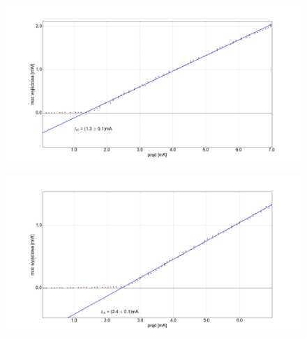 \documentclass[xcolor={dvipsnames,table}]{beamer}
\begin{document}
\begin{frame}
\center
\begin{figure}
   \includegraphics[width=1.10\textwidth,natwidth=69,natheight=87]{temp_50_fit.png}
\end{figure}
\end{frame}

\begin{frame}
\center
\begin{figure}
   \includegraphics[width=1.10\textwidth,natwidth=69,natheight=87]{temp_90_fit.png}
\end{figure}
\end{frame}
\end{document}
